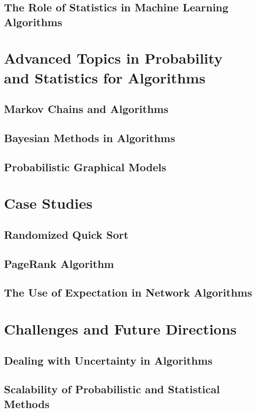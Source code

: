 \documentclass[12pt]{book} %
\begin{document}
\subsection{The Role of Statistics in Machine Learning Algorithms}

\section{Advanced Topics in Probability and Statistics for Algorithms}
\subsection{Markov Chains and Algorithms}
\subsection{Bayesian Methods in Algorithms}
\subsection{Probabilistic Graphical Models}

\section{Case Studies}
\subsection{Randomized Quick Sort}
\subsection{PageRank Algorithm}
\subsection{The Use of Expectation in Network Algorithms}

\section{Challenges and Future Directions}
\subsection{Dealing with Uncertainty in Algorithms}
\subsection{Scalability of Probabilistic and Statistical Methods}
\end{document}
